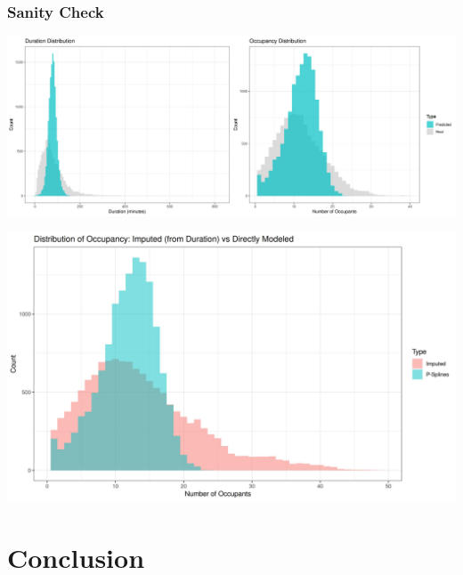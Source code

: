 \documentclass{beamer}
\begin{document}
\begin{frame}
\frametitle{Sanity Check}
    \vspace{-0.35cm}
    \begin{center}
        \includegraphics[width=1.0\textwidth, height=0.49\textheight]{images/evaluation/distribution_comparisons.jpg}
        
        \vspace{0.1cm} %
        
        \includegraphics[width=1.0\textwidth, height=0.45\textheight]{images/evaluation/occupancy_comparison_histogram.jpg}

    \end{center}
\end{frame}

\section{Conclusion}
\end{document}
